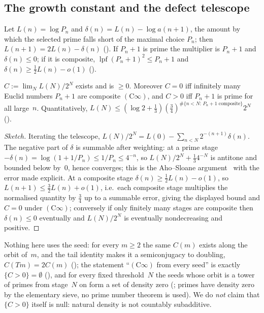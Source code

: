 \documentclass[10pt,a4paper]{article}
\newcommand{\lpf}{\operatorname{lpf}}
\newcommand{\Cinf}{(\mathrm{C}\infty)}
\begin{document}
\subsection{The growth constant and the defect telescope}

Let $L(n)=\log P_n$ and $\delta(n)=L(n)-\log a(n{+}1)$, the amount by which
the selected prime falls short of the maximal choice $P_n$; then
$L(n{+}1)=2L(n)-\delta(n)$
().
If $P_n+1$ is prime the multiplier is $P_n+1$ and $\delta(n)\le0$; if it is
composite, $\lpf(P_n+1)^2\le P_n+1$ and $\delta(n)\ge\tfrac12L(n)-o(1)$
().

\begin{theorem}
$C:=\lim_{N}L(N)/2^{N}$ exists and is $\ge0$.  Moreover $C=0$ iff
infinitely many Euclid numbers $P_n+1$ are composite $\Cinf$, and $C>0$ iff
$P_n+1$ is prime for all large~$n$.  Quantitatively,
$L(N)\le(\log2+\tfrac13)(\tfrac34)^{\#\{n<N:\,P_n+1\text{ composite}\}}2^{N}$
().
\end{theorem}

\begin{proof}[Sketch]
Iterating the telescope, $L(N)/2^{N}=L(0)-\sum_{n<N}2^{-(n+1)}\delta(n)$.
The negative part of $\delta$ is summable after weighting: at a prime stage
$-\delta(n)=\log(1+1/P_n)\le1/P_n\le4^{-n}$, so $L(N)/2^{N}+\tfrac13 4^{-N}$
is antitone and bounded below by~$0$, hence converges; this is the
Aho--Sloane argument~\cite{AhoSloane1973} with the error made explicit.
At a composite stage $\delta(n)\ge\tfrac12L(n)-o(1)$, so
$L(n{+}1)\le\tfrac32L(n)+o(1)$, i.e.\ each composite stage multiplies the
normalised quantity by $\tfrac34$ up to a summable error, giving the
displayed bound and $C=0$ under $\Cinf$; conversely if only finitely many
stages are composite then $\delta(n)\le0$ eventually and $L(N)/2^{N}$ is
eventually nondecreasing and positive.
\end{proof}  Nothing here uses the
seed: for every $m\ge2$ the same $C(m)$ exists along the orbit of~$m$, and
the tail identity makes it a semiconjugacy to doubling,
$C(Tm)=2C(m)$ (); the
statement ``$\Cinf$ from every seed'' is exactly $\{C>0\}=\emptyset$
(),
and for every fixed threshold~$N$ the seeds whose orbit is a tower of
primes from stage~$N$ on form a set of density zero
(; primes
have density zero by the elementary sieve, no prime number theorem is
used).  We do \emph{not} claim that $\{C>0\}$ itself is null: natural
density is not countably subadditive.
\end{document}
